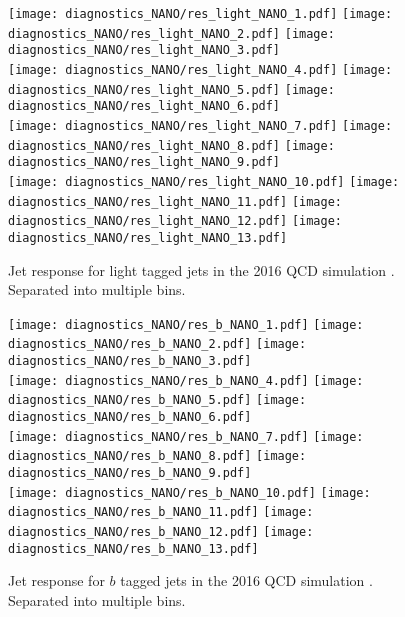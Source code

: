 \begin{figure}[!h]
	\begin{center}
  \texttt{[image: diagnostics\_NANO/res\_light\_NANO\_1.pdf]}
  \texttt{[image: diagnostics\_NANO/res\_light\_NANO\_2.pdf]} 
  \texttt{[image: diagnostics\_NANO/res\_light\_NANO\_3.pdf]} \\
  \texttt{[image: diagnostics\_NANO/res\_light\_NANO\_4.pdf]}
  \texttt{[image: diagnostics\_NANO/res\_light\_NANO\_5.pdf]} 
  \texttt{[image: diagnostics\_NANO/res\_light\_NANO\_6.pdf]} \\
  \texttt{[image: diagnostics\_NANO/res\_light\_NANO\_7.pdf]}
  \texttt{[image: diagnostics\_NANO/res\_light\_NANO\_8.pdf]} 
  \texttt{[image: diagnostics\_NANO/res\_light\_NANO\_9.pdf]} \\
  \texttt{[image: diagnostics\_NANO/res\_light\_NANO\_10.pdf]}
  \texttt{[image: diagnostics\_NANO/res\_light\_NANO\_11.pdf]} 
  \texttt{[image: diagnostics\_NANO/res\_light\_NANO\_12.pdf]}     
  \texttt{[image: diagnostics\_NANO/res\_light\_NANO\_13.pdf]} \\      
	\end{center}
	\caption[Light Jet Response]{Jet response for light tagged jets in the 2016 QCD simulation . Separated into multiple \pt{} bins.
	 }
	\label{fig:qcd-light-jet-res}
\end{figure}
\begin{figure}[!h]
	\begin{center}  
  \texttt{[image: diagnostics\_NANO/res\_b\_NANO\_1.pdf]}
  \texttt{[image: diagnostics\_NANO/res\_b\_NANO\_2.pdf]} 
  \texttt{[image: diagnostics\_NANO/res\_b\_NANO\_3.pdf]} \\
  \texttt{[image: diagnostics\_NANO/res\_b\_NANO\_4.pdf]}
  \texttt{[image: diagnostics\_NANO/res\_b\_NANO\_5.pdf]} 
  \texttt{[image: diagnostics\_NANO/res\_b\_NANO\_6.pdf]} \\
  \texttt{[image: diagnostics\_NANO/res\_b\_NANO\_7.pdf]}
  \texttt{[image: diagnostics\_NANO/res\_b\_NANO\_8.pdf]} 
  \texttt{[image: diagnostics\_NANO/res\_b\_NANO\_9.pdf]} \\
  \texttt{[image: diagnostics\_NANO/res\_b\_NANO\_10.pdf]}
  \texttt{[image: diagnostics\_NANO/res\_b\_NANO\_11.pdf]} 
  \texttt{[image: diagnostics\_NANO/res\_b\_NANO\_12.pdf]}     
  \texttt{[image: diagnostics\_NANO/res\_b\_NANO\_13.pdf]} \\ 
	\end{center}
	\caption[B Jet Response]{Jet response for $b$ tagged jets in the 2016 QCD simulation . Separated into multiple \pt{} bins.
	 }
	\label{fig:qcd-b-jet-res}
\end{figure}

